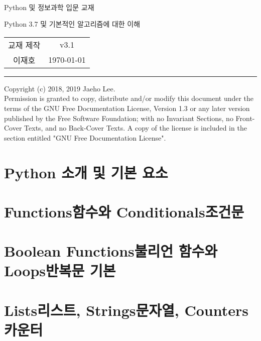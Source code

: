 \documentclass[a4paper, 10pt, twoside, calcwidth]{oblivoir}
\begin{document}
\begin{center}\sffamily
\text{}\\[1cm]
\huge Python 및 정보과학 입문 교재

\vspace{.1cm}
\Large Python 3.7 및 기본적인 알고리즘에 대한 이해\\[.6cm]
	\begin{tabular} {c c}
		교재 제작 & v3.1\\
		이재호 & \today
	\end{tabular}
\end{center}
\vspace{.5cm}
\noindent\rule[0.5ex]{\linewidth}{.5pt}
\tableofcontents*

\vspace{2cm}
{\scriptsize
\noindent Copyright (c)  2018, 2019  Jaeho Lee.\\
Permission is granted to copy, distribute and/or modify this document
under the terms of the GNU Free Documentation License, Version 1.3
or any later version published by the Free Software Foundation;
with no Invariant Sections, no Front-Cover Texts, and no Back-Cover Texts.
A copy of the license is included in the section entitled "GNU
Free Documentation License".
}

\pagebreak

\section{Python 소개 및 기본 요소}



\section{Functions함수와 Conditionals조건문}



\section{Boolean Functions불리언 함수와 Loops반복문 기본}

% 

\section{Lists리스트, Strings문자열, Counters카운터}

% 
\end{document}
